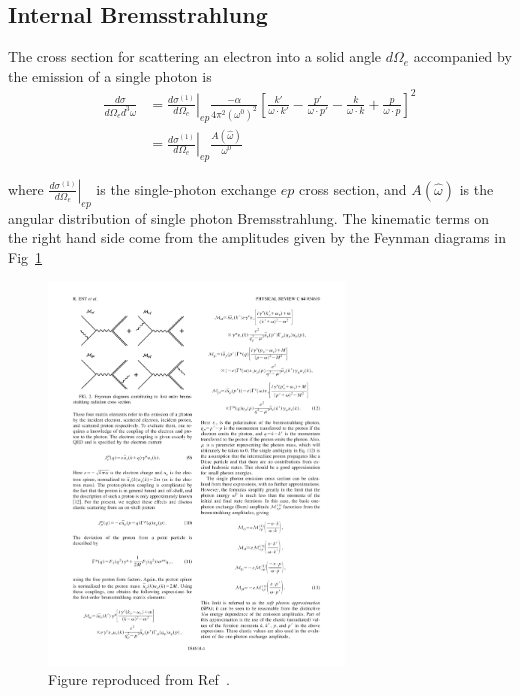 \subsection{Internal Bremsstrahlung}
The cross section for scattering an electron into a solid angle $d\Omega_e$
accompanied by the emission of a single photon is
\begin{align}
    \frac{d\sigma}{d\Omega_e d^3\omega} &=
        \left.\frac{d \sigma^{(1)}}{d \Omega_{e}}\right|_{e p}
        \frac{-\alpha}{4 \pi^{2} (\omega^{0})^2}
        \left[ \frac{k'}{\omega \cdot k'} -
                \frac{p'}{\omega \cdot p'} -
               \frac{k}{\omega \cdot k} +
               \frac{p}{\omega \cdot p}
        \right]^2 \\
     &= \left. \frac{d\sigma^{(1)}}{d\Omega_e}\right|_{ep}
         \frac{A(\hat{\omega})}{\omega^0}
\end{align}

where $\left. \frac{d\sigma^{(1)}}{d\Omega_e}\right|_{ep}$ is the single-photon
exchange $ep$ cross section,
and $A(\hat{\omega})$ is the angular distribution of single photon Bremsstrahlung.
The kinematic terms on the right hand side come from the
amplitudes given by the Feynman diagrams in Fig~\ref{fig:single_photon_brem_feynman}

\begin{figure}[!h]
    \centering
    \includegraphics[width=0.7\textwidth]{chap1/single_photon_brem_feynman.pdf}
    \caption{
             Figure reproduced from Ref~\cite{Ent_2001}.
             }
    \label{fig:single_photon_brem_feynman}
\end{figure}

